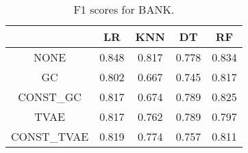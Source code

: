 \begin{table}
\caption{F1 scores for BANK.}
\label{tab:f1-BANK}
\begin{tabular}{ccccc}
\toprule
 & LR & KNN & DT & RF \\
\midrule
NONE & 0.848 & 0.817 & 0.778 & 0.834 \\
GC & 0.802 & 0.667 & 0.745 & 0.817 \\
CONST\_GC & 0.817 & 0.674 & 0.789 & 0.825 \\
TVAE & 0.817 & 0.762 & 0.789 & 0.797 \\
CONST\_TVAE & 0.819 & 0.774 & 0.757 & 0.811 \\
\bottomrule
\end{tabular}
\end{table}
